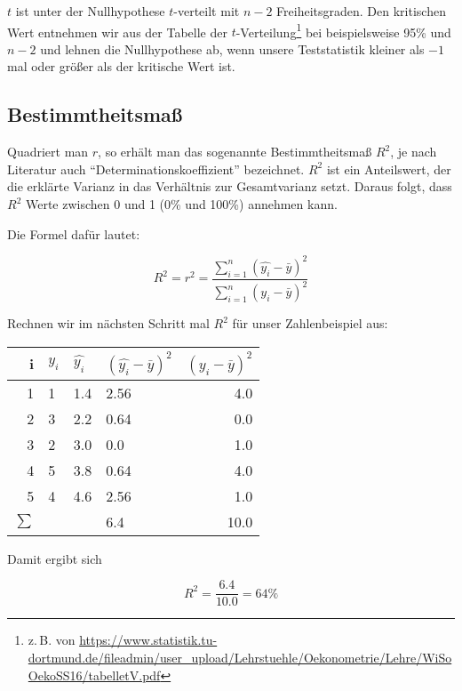 \documentclass[ngerman, 12pt]{scrartcl}
\begin{document}
\(t\) ist unter der Nullhypothese \(t\)-verteilt mit \(n-2\) Freiheitsgraden. Den kritischen Wert entnehmen wir aus der Tabelle der \(t\)-Verteilung\footnote{z.\,B. von \url{https://www.statistik.tu-dortmund.de/fileadmin/user_upload/Lehrstuehle/Oekonometrie/Lehre/WiSoOekoSS16/tabelletV.pdf}} bei beispielsweise 95\% und \(n-2\)
und lehnen die Nullhypothese ab, wenn unsere Teststatistik kleiner als \(-1\) mal oder größer als der kritische Wert ist.


\subsection{Bestimmtheitsmaß}

Quadriert man \(r\), so erhält man das sogenannte Bestimmtheitsmaß \(R^2\), je nach Literatur auch \enquote{Determinationskoeffizient} bezeichnet. \(R^2\) ist ein Anteilswert, der die erklärte Varianz in das Verhältnis zur Gesamtvarianz setzt. Daraus folgt, dass \(R^2\) Werte zwischen 0 und 1 (0\% und 100\%) annehmen kann. 

Die Formel dafür lautet:

\begin{equation}
R^2 = r^2 = \frac{\sum_{i=1}^n (\hat{y_i} - \bar{y})^2} {\sum_{i=1}^n (y_i - \bar{y})^2}
\end{equation}

Rechnen wir im nächsten Schritt mal \(R^2\) für unser Zahlenbeispiel aus:

\begin{center}
\begin{tabular}{r|lllr} \toprule
i & \(y_i\)  & \(\hat{y_i}\) & \((\hat{y_i} - \bar{y})^2 \)&  \((y_i - \bar{y})^2\) \\ \midrule
1 & 1 &  1.4 & 2.56    & 4.0\\
2 & 3 &  2.2 &  0.64 & 0.0\\
3 & 2 &  3.0 & 0.0     & 1.0\\ 
4 & 5 &  3.8 & 0.64    & 4.0\\ 
5 & 4 &  4.6 & 2.56    & 1.0\\ \midrule
\(\sum\) & & & 6.4 & 10.0\\ \bottomrule
\end{tabular}
\end{center}

Damit ergibt sich

\begin{equation}
R^2 = \frac{6.4}{10.0} = 64 \%
\end{equation}
\end{document}
